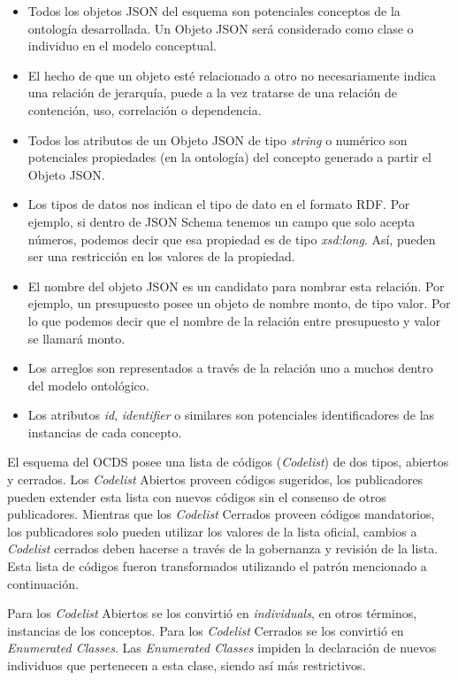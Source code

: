 \begin{itemize}
    \item Todos los objetos JSON del esquema son potenciales conceptos de la ontología desarrollada. Un Objeto JSON será considerado como clase o individuo en el modelo conceptual.
    \item El hecho de que un objeto esté relacionado a otro no necesariamente indica una relación de jerarquía, puede a la vez tratarse de una relación de contención, uso, correlación o dependencia.
    \item Todos los atributos de un Objeto JSON de tipo \textit{string} o numérico son potenciales propiedades (en la ontología) del concepto generado a partir el Objeto JSON.
    \item Los tipos de datos nos indican el tipo de dato en el formato RDF. Por ejemplo, si dentro de JSON Schema tenemos un campo que solo acepta números, podemos decir que esa propiedad es de tipo \textit{xsd:long}. Así, pueden ser una restricción en los valores de la propiedad.
    \item El nombre del objeto JSON es un candidato para nombrar esta relación. Por ejemplo, un presupuesto posee un objeto de nombre monto, de tipo valor. Por lo que podemos decir que el nombre de la relación entre presupuesto y valor se llamará monto.
    \item Los arreglos son representados a través de la relación uno a muchos dentro del modelo ontológico.
    \item Los atributos \textit{id}, \textit{identifier} o similares son potenciales identificadores de las instancias de cada concepto.
    
\end{itemize}

El esquema del OCDS posee una lista de códigos (\textit{Codelist}) de dos tipos, abiertos y cerrados. Los \textit{Codelist} Abiertos proveen códigos sugeridos, los publicadores pueden extender esta lista con nuevos códigos sin el consenso de otros publicadores. Mientras que los \textit{Codelist} Cerrados proveen códigos mandatorios, los publicadores solo pueden utilizar los valores de la lista oficial, cambios a \textit{Codelist} cerrados deben hacerse a través de la gobernanza y revisión de la lista. Esta lista de códigos fueron transformados utilizando el patrón mencionado a continuación. 

Para los \textit{Codelist} Abiertos se los convirtió en \textit{individuals}, en otros términos, instancias de los conceptos. Para los \textit{Codelist} Cerrados  se los convirtió en \textit{Enumerated Classes}. Las \textit{Enumerated Classes} impiden la declaración de nuevos individuos que pertenecen a esta clase, siendo así más restrictivos.
